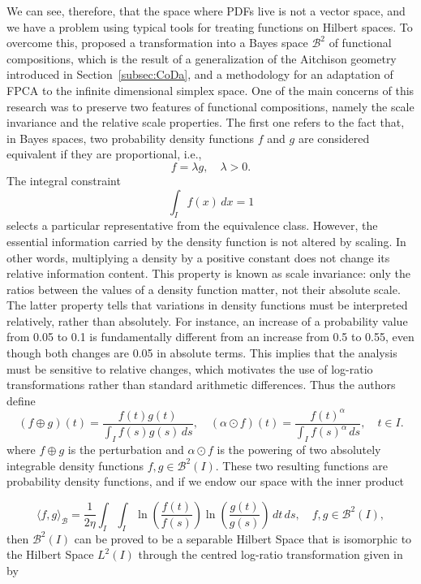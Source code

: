 \documentclass[
	12pt,				%
	oneside,			%
	a4paper,			%
	english,			%
	brazil				%
	]{abntex2ppgsi}
\begin{document}
We can see, therefore, that the space where PDFs live is not a vector space, and we have a problem using typical tools for treating functions on Hilbert spaces. To overcome this,  proposed a transformation into a Bayes space $\mathcal{B}^2$ of functional compositions, which is the result of a generalization of the Aitchison geometry introduced in Section~\ref{subsec:CoDa}, and a methodology for an adaptation of FPCA to the infinite dimensional simplex space. One of the main concerns of this research was to preserve two features of functional compositions, namely the  scale invariance and the relative scale properties. The first one refers to the fact that, in Bayes spaces, two probability density functions \( f \) and \( g \) are considered equivalent if they are proportional, i.e.,
\[
f = \lambda g, \quad \lambda > 0.
\]
The integral constraint
\[
\int_I f(x) \, dx = 1
\]
selects a particular representative from the equivalence class. However, the essential information carried by the density function is not altered by scaling. In other words, multiplying a density by a positive constant does not change its relative information content. This property is known as scale invariance: only the ratios between the values of a density function matter, not their absolute scale. %
The latter property tells that variations in density functions must be interpreted relatively, rather than absolutely. For instance, an increase of a probability value from 0.05 to 0.1 is fundamentally different from an increase from 0.5 to 0.55, even though both changes are 0.05 in absolute terms. This implies that the analysis must be sensitive to relative changes, which motivates the use of log-ratio transformations rather than standard arithmetic differences. Thus the authors define 
\[
(f \oplus g)(t) = \frac{f(t)g(t)}{\int_I f(s)g(s) \, ds}, \quad (\alpha \odot f)(t) = \frac{f(t)^\alpha}{\int_I f(s)^\alpha \, ds}, \quad t \in I.
\]
where $f \oplus g$ is the perturbation and $\alpha \odot f$ is the powering of two absolutely integrable density functions $f,g \in \mathcal{B}^2(I)$. These two resulting functions are probability density functions, and if we endow our space with the inner product    

\[
\langle f, g \rangle_{\mathcal{B}} = \frac{1}{2\eta} \int_I \int_I \ln\left( \frac{f(t)}{f(s)} \right) \ln\left( \frac{g(t)}{g(s)} \right) \, dt \, ds, \quad f, g \in \mathcal{B}^2(I),
\]
then $\mathcal{B}^2(I)$ can be proved to be a separable Hilbert Space that is isomorphic to the Hilbert Space $L^2(I)$ through the centred log-ratio transformation given in  by 
\end{document}
